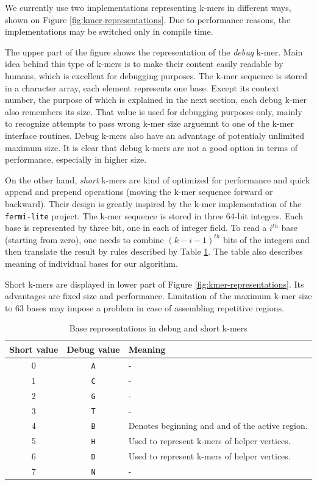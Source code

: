 We currently use two implementations representing k-mers in different ways, shown on Figure \ref{fig:kmer-representations}. Due to performance reasons, the implementations may be switched only in compile time. 

The upper part of the figure shows the representation of the \textit{debug} k-mer. Main idea behind this type of k-mers is to make their content easily readable by humans, which is excellent for debugging purposes. The k-mer sequence is stored in a character array, each element represents one base. Except its context number, the purpose of which is explained in the next section, each debug k-mer also remembers its size. That value is used for debugging purposes only, mainly to recognize attempts to pass wrong k-mer size arguemnt to one of the k-mer interface routines. Debug k-mers also have an advantage of potentialy unlimited maximum size. It is clear that debug k-mers are not a good option in terms of performance, especially in higher size.

On the other hand, \textit{short} k-mers are kind of optimized for performance and quick append and prepend operations (moving the k-mer sequence forward or backward). Their design is greatly inspired by the k-mer implementation of the \texttt{fermi-lite} project. The k-mer sequence is stored in three 64-bit integers. Each base is represented by three bit, one in each of integer field. To read a $i^{th}$ base (starting from zero), one needs to combine $(k-i-1)^{th}$ bits of the integers and then translate the result by rules described by Table \ref{tab:base-translation}. The table also describes meaning of individual bases for our algorithm.

Short k-mers are displayed in lower part of Figure \ref{fig:kmer-representations}. Its advantages are fixed size and performance. Limitation of the maximum k-mer size to 63 bases may impose a problem in case of assembling repetitive regions.

\begin{table}[h]
\begin{center}
\caption{Base representations in debug and short k-mers}
\label{tab:base-translation}
\begin{tabular}{| c | c | p{5cm} |}
\hline
Short value & Debug value & Meaning \\
\hline
0 & \texttt{A} & - \\
\hline
1 & \texttt{C} & - \\
\hline
2 & \texttt{G} & - \\
\hline
3 & \texttt{T} & - \\
\hline
4 & \texttt{B} & Denotes beginning and and of the active region. \\
\hline
5 & \texttt{H} & Used to represent k-mers of helper vertices. \\
\hline
6 & \texttt{D} & Used to represent k-mers of helper vertices. \\
\hline
7 & \texttt{N} & - \\
\hline
\end{tabular}
\end{center}
\end{table}

